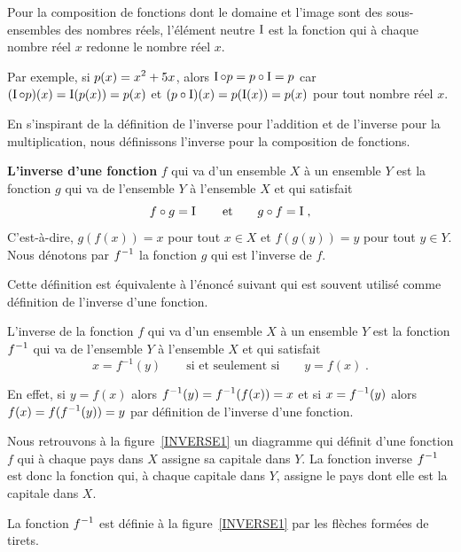 {\begin{egg}
Pour la composition de fonctions dont le domaine et l'image sont des
sous-ensembles des nombres réels, l'élément neutre $\operatorname{I}$ est la
fonction qui à chaque nombre réel $x$ redonne le nombre réel $x$.

Par exemple, si $\displaystyle p(x) = x^2 + 5x$, alors $\operatorname{I} \circ p = p \circ \operatorname{I} = p$
car $(\operatorname{I} \circ p)(x) = \operatorname{I}(p(x)) = p(x)$ et
$(p \circ \operatorname{I})(x) = p(\operatorname{I}(x)) = p(x)$ pour tout nombre réel $x$.
\end{egg}

En s'inspirant de la définition de l'inverse pour l'addition et de
l'inverse pour la multiplication, nous définissons l'inverse pour la
composition de fonctions.

\begin{defn} 
{\bfseries L'inverse d'une fonction} $f$ qui
va d'un ensemble $X$ à un ensemble $Y$ est la fonction $g$ qui va de
l'ensemble $Y$ à l'ensemble $X$ et qui satisfait
\[
f\circ g = \operatorname{I} \qquad \text{et}  \qquad  g \circ f = \operatorname{I} \; ,
\]
C'est-à-dire, $g(f(x)) = x$ pour tout $x \in X$ et $f(g(y)) = y$
pour tout $y\in Y$.  Nous dénotons par $\displaystyle f^{-1}$ la fonction $g$ qui est
l'inverse de $f$.
\end{defn}

Cette définition est équivalente à l'énoncé suivant qui est
souvent utilisé comme défini\-tion de l'inverse d'une fonction.

\begin{defn}
L'inverse de la fonction $f$ qui va d'un ensemble $X$ à un ensemble
$Y$ est la fonction $\displaystyle f^{-1}$ qui va de l'ensemble $Y$ à l'ensemble $X$
et qui satisfait
\[
x = f^{-1}(y) \qquad \text{si et seulement si} \qquad y = f(x) \; .
\]
\end{defn}

En effet, si $y=f(x)$ alors $\displaystyle f^{-1}(y) = f^{-1}(f(x)) = x$ et si
$\displaystyle x = f^{-1}(y)$ alors $\displaystyle f(x) = f(f^{-1}(y)) = y$ par définition
de l'inverse d'une fonction.

\begin{egg}
Nous retrouvons à la figure~\ref{INVERSE1} un diagramme qui définit
d'une fonction $f$ qui à chaque pays dans $X$ assigne sa capitale dans
$Y$.  La fonction inverse $\displaystyle f^{-1}$ est donc la fonction qui, à chaque
capitale dans $Y$, assigne le pays dont elle est la capitale dans $X$.

La fonction $\displaystyle f^{-1}$ est définie à la figure~\ref{INVERSE1} par les
flèches formées de tirets.
\label{FMOINS1}
\end{egg}

}
